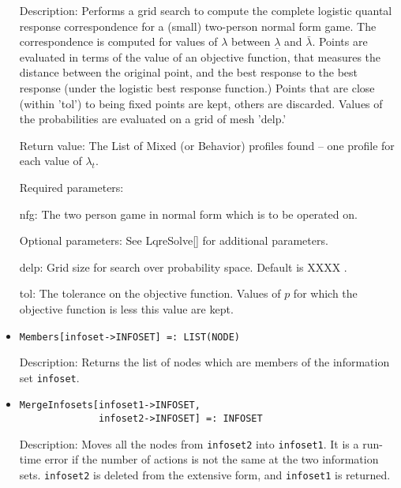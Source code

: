 \begin{itemize}
\bd
\item
[Description:] Performs a grid search to compute the complete logistic
quantal response correspondence for a (small) two-person normal form
game.  The correspondence is computed for values of $\lambda$ between
$\underline{\lambda}$ and $\bar{\lambda}.$ Points are evaluated in
terms of the value of an objective function, that measures the
distance between the original point, and the best response to the best
response (under the logistic best response function.)  Points that are
close (within 'tol') to being fixed points are kept, others are
discarded.  Values of the probabilities are evaluated on a grid of
mesh 'delp.'

\item
[Return value:] The List of Mixed (or Behavior) profiles found -- one
profile for each value of $\lambda_t$. 

\item
[Required parameters:]\hfil\null
	
\bd
\item  
[nfg:] The two person game in normal form which is to be operated on.
\ed

\item
[Optional parameters:]  See LqreSolve[] for additional parameters.

\bd
\item
[delp:] Grid size for search over probability space.  Default is XXXX .
\item
[tol:] The tolerance on the objective function.  Values of $p$ for
which the objective function is less this value are kept.  
\ed
\ed


\item
\protect \large \begin{verbatim}
Members[infoset->INFOSET] =: LIST(NODE)
\end{verbatim}\normalsize

\bd
\item
[Description:] Returns the list of nodes which are members of the information
set \verb+infoset+.
\ed

\item
\protect \large \begin{verbatim}
MergeInfosets[infoset1->INFOSET,
              infoset2->INFOSET] =: INFOSET
\end{verbatim}\normalsize

\bd
\item
[Description:] Moves all the nodes from \verb+infoset2+ into \verb+infoset1+.
It is a run-time error if the number of actions is not the same at the
two information sets.  \verb+infoset2+ is deleted from the extensive form,
and \verb+infoset1+ is returned.
\ed


\end{itemize}

